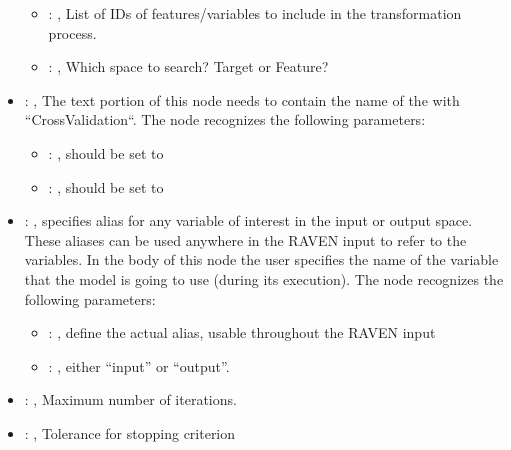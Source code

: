 \begin{itemize}
\begin{itemize}
        \item {}: , 
          List of IDs of features/variables to include in the transformation process.

        \item {}: , 
          Which space to search? Target or Feature?
      \end{itemize}

    \item {}: , 
      The text portion of this node needs to contain the name of the  with
               ``CrossValidation``.
      The  node recognizes the following parameters:
        \begin{itemize}
          \item {}: , 
            should be set to 
          \item {}: , 
            should be set to 
      \end{itemize}

    \item {}: , 
      specifies alias for         any variable of interest in the input or output space. These
      aliases can be used anywhere in the RAVEN input to         refer to the variables. In the body
      of this node the user specifies the name of the variable that the model is going to use
      (during its execution).
      The  node recognizes the following parameters:
        \begin{itemize}
          \item {}: , 
            define the actual alias, usable throughout the RAVEN input
          \item {}: , 
            either ``input'' or ``output''.
      \end{itemize}

    \item {}: , 
      Maximum number of iterations.

    \item {}: , 
      Tolerance for stopping criterion


\end{itemize}
